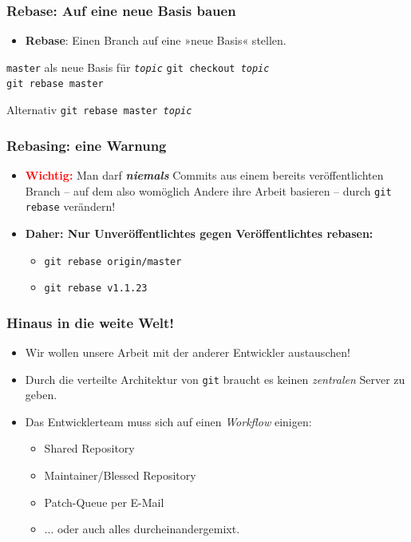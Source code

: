 \documentclass{beamer}
\begin{document}
\begin{frame}
 \frametitle{Rebase: Auf eine neue Basis bauen}



\begin{itemize}
	\item \textbf{Rebase}: Einen Branch auf eine »neue Basis« stellen.
\end{itemize}
\begin{block}{\texttt{master} als neue Basis für \texttt{\emph{topic}}}
\texttt{git checkout \emph{topic}} \\
\texttt{git rebase master}
\end{block}

\begin{block}{Alternativ}
\texttt{git rebase master \emph{topic}}
\end{block}


 \end{frame}
\begin{frame}
 \frametitle{Rebasing: eine Warnung}



\begin{itemize}
	\item \textcolor{red}{\textbf{Wichtig:}} Man darf \textbf{\emph{niemals}} Commits aus einem bereits veröffentlichten Branch -- auf dem also womöglich Andere ihre Arbeit basieren -- durch \texttt{git rebase} verändern!
	\item \textbf{Daher: Nur Unveröffentlichtes gegen Veröffentlichtes rebasen:}
\begin{itemize}
	\item \texttt{git rebase origin/master}
	\item \texttt{git rebase v1.1.23}
\end{itemize}
\end{itemize}


 \end{frame}

\begin{frame}
 \frametitle{Hinaus in die weite Welt!}
\begin{itemize}
	\item Wir wollen unsere Arbeit mit der anderer Entwickler austauschen!
	\item Durch die verteilte Architektur von \texttt{git} braucht es keinen \emph{zentralen} Server zu geben.
	\item Das Entwicklerteam muss sich auf einen \emph{Workflow} einigen:
	\begin{itemize}
		\item Shared Repository
		\item Maintainer/Blessed Repository
		\item Patch-Queue per E-Mail
		\item ... oder auch alles durcheinandergemixt.
	\end{itemize}
\end{itemize}
 \end{frame}
\end{document}
